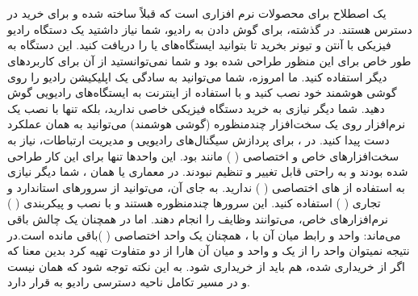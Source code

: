 \documentclass[landscape, 12pt]{report}
\begin{document}
\section*{}
یک اصطلاح برای محصولات نرم افزاری است که قبلاً ساخته شده و برای خرید در دسترس هستند. در گذشته، برای گوش دادن به رادیو، شما نیاز داشتید یک دستگاه رادیو فیزیکی با آنتن و تیونر بخرید تا بتوانید ایستگاه‌های
  یا
    را دریافت کنید. این دستگاه به طور خاص برای این منظور طراحی شده بود و شما نمی‌توانستید از آن برای کاربردهای دیگر استفاده کنید. ما امروزه، شما می‌توانید به سادگی یک اپلیکیشن رادیو را روی گوشی هوشمند خود نصب کنید و با استفاده از اینترنت به ایستگاه‌های رادیویی گوش دهید. شما دیگر نیازی به خرید دستگاه فیزیکی خاصی ندارید، بلکه تنها با نصب یک نرم‌افزار روی یک سخت‌افزار چندمنظوره (گوشی هوشمند) می‌توانید به همان عملکرد دست پیدا کنید. در 
    ، برای پردازش سیگنال‌های رادیویی و مدیریت ارتباطات، نیاز به سخت‌افزارهای خاص و اختصاصی
    (
  ) مانند 
   بود. این واحدها تنها برای این کار طراحی شده بودند و به راحتی قابل تغییر و تنظیم نبودند. در معماری
     یا همان
     ، شما دیگر نیازی به استفاده از
      های اختصاصی (
    ) ندارید. به جای آن، می‌توانید از سرورهای استاندارد و تجاری (
    ) استفاده کنید. این سرورها چندمنظوره هستند و با نصب و پیکربندی  (
    ) نرم‌افزارهای خاص، می‌توانند وظایف
     را انجام دهند. اما در
       همچنان یک چالش باقی می‌ماند: واحد
          و رابط میان آن با
            ، همچنان یک واحد اختصاصی (
            )باقی مانده است.در نتیجه نمیتوان واحد 
             را از یک
              و  واحد 
               و 
                 میان آن ‌هارا از دو
                   متفاوت تهیه کرد بدین معنا که اگر
                    از 
                     خریداری شده،
                       هم باید از
                         خریداری شود. به این نکته توجه شود که
                           همان
                             نیست و در مسیر تکامل ناحیه دسترسی رادیو به
                               قرار دارد.
\end{document}
